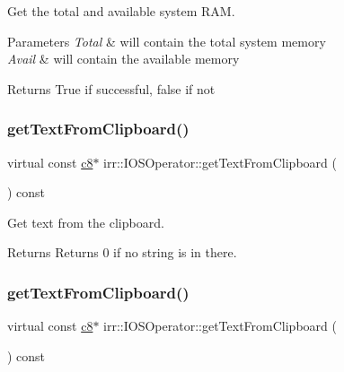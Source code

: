 Get the total and available system R\+AM. 


\begin{DoxyParams}{Parameters}
{\em Total} & will contain the total system memory \\
\hline
{\em Avail} & will contain the available memory \\
\hline
\end{DoxyParams}
\begin{DoxyReturn}{Returns}
True if successful, false if not 
\end{DoxyReturn}
\mbox{\label{classirr_1_1IOSOperator_a9026ff9f28b48615971e18fcee6fff4c}} 
\subsubsection{\texorpdfstring{get\+Text\+From\+Clipboard()}{getTextFromClipboard()}\hspace{0.1cm}{\footnotesize\ttfamily [1/2]}}
{\footnotesize\ttfamily virtual const \hyperlink{namespaceirr_a9395eaea339bcb546b319e9c96bf7410}{c8}$\ast$ irr\+::\+I\+O\+S\+Operator\+::get\+Text\+From\+Clipboard (\begin{DoxyParamCaption}{ }\end{DoxyParamCaption}) const\hspace{0.3cm}{\ttfamily [pure virtual]}}



Get text from the clipboard. 

\begin{DoxyReturn}{Returns}
Returns 0 if no string is in there. 
\end{DoxyReturn}
\mbox{\label{classirr_1_1IOSOperator_a9026ff9f28b48615971e18fcee6fff4c}} 
\subsubsection{\texorpdfstring{get\+Text\+From\+Clipboard()}{getTextFromClipboard()}\hspace{0.1cm}{\footnotesize\ttfamily [2/2]}}
{\footnotesize\ttfamily virtual const \hyperlink{namespaceirr_a9395eaea339bcb546b319e9c96bf7410}{c8}$\ast$ irr\+::\+I\+O\+S\+Operator\+::get\+Text\+From\+Clipboard (\begin{DoxyParamCaption}{ }\end{DoxyParamCaption}) const\hspace{0.3cm}{\ttfamily [pure virtual]}}



